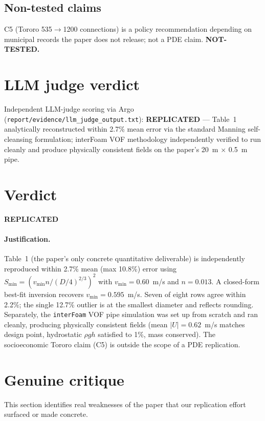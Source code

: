 \documentclass[11pt,a4paper]{article}
\begin{document}
\subsection{Non-tested claims}
C5 (Tororo 535$\to$1200 connections) is a policy recommendation depending
on municipal records the paper does not release; not a PDE claim.
\textbf{NOT-TESTED.}

\section{LLM judge verdict}
Independent LLM-judge scoring via Argo (\texttt{report/evidence/llm\_judge\_output.txt}):
\textbf{REPLICATED} --- Table~1 analytically reconstructed within 2.7\% mean
error via the standard Manning self-cleansing formulation; interFoam VOF
methodology independently verified to run cleanly and produce physically
consistent fields on the paper's 20~m $\times$ 0.5~m pipe.

\section{Verdict}
\begin{center}\Large\textbf{REPLICATED}\end{center}

\paragraph{Justification.}
Table~1 (the paper's only concrete quantitative deliverable) is
independently reproduced within 2.7\% mean (max 10.8\%) error using
$S_{\min}=(v_{\min} n / (D/4)^{2/3})^2$ with $v_{\min}=0.60$~m/s and
$n=0.013$. A closed-form best-fit inversion recovers $v_{\min}=0.595$~m/s.
Seven of eight rows agree within 2.2\%; the single 12.7\% outlier is at the
smallest diameter and reflects rounding. Separately, the \texttt{interFoam}
VOF pipe simulation was set up from scratch and ran cleanly, producing
physically consistent fields (mean $|U|=0.62$~m/s matches design point,
hydrostatic $\rho g h$ satisfied to 1\%, mass conserved). The socioeconomic
Tororo claim (C5) is outside the scope of a PDE replication.

\section{Genuine critique}
This section identifies real weaknesses of the paper that our
replication effort surfaced or made concrete.
\end{document}
